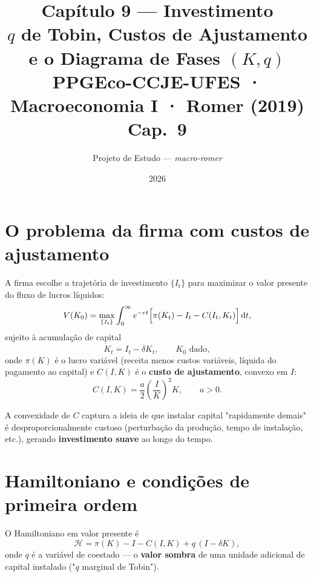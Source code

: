 \documentclass[11pt,a4paper]{article}
\title{\textbf{Capítulo 9 --- Investimento}\\[4pt]
       {\large $q$ de Tobin, Custos de Ajustamento e o Diagrama de Fases $(K,q)$}\\[2pt]
       {\normalsize PPGEco-CCJE-UFES · Macroeconomia I · Romer (2019) Cap.\ 9}}
\author{Projeto de Estudo --- \textit{macro-romer}}
\date{2026}
\newcommand{\dd}{\mathrm{d}}
\begin{document}
\maketitle
\tableofcontents
\bigskip

\section{O problema da firma com custos de ajustamento}

A firma escolhe a trajetória de investimento $\{I_t\}$ para maximizar o
valor presente do fluxo de lucros líquidos:
\begin{equation}\label{eq:firm_value}
  V(K_0) = \max_{\{I_t\}} \int_0^\infty e^{-rt}
    \Bigl[\pi(K_t) - I_t - C(I_t, K_t)\Bigr]\,\dd t,
\end{equation}
sujeito à acumulação de capital
\begin{equation}\label{eq:capital_accumulation}
  \dot K_t = I_t - \delta K_t, \qquad K_0 \text{ dado},
\end{equation}
onde $\pi(K)$ é o lucro variável (receita menos custos variáveis,
líquida do pagamento ao capital) e $C(I,K)$ é o \textbf{custo de
ajustamento}, convexo em $I$:
\begin{equation}\label{eq:adjustment_cost}
  C(I,K) = \frac{a}{2}\left(\frac{I}{K}\right)^2 K, \qquad a > 0.
\end{equation}

A convexidade de $C$ captura a ideia de que instalar capital
"rapidamente demais" é desproporcionalmente custoso (perturbação da
produção, tempo de instalação, etc.), gerando \textbf{investimento
suave} ao longo do tempo.

\section{Hamiltoniano e condições de primeira ordem}

O Hamiltoniano em valor presente é
\begin{equation}\label{eq:hamiltonian}
  \mathcal{H} = \pi(K) - I - C(I,K) + q\,(I - \delta K),
\end{equation}
onde $q$ é a variável de coestado --- o \textbf{valor sombra} de uma
unidade adicional de capital instalado ("$q$ marginal de Tobin").
\end{document}
